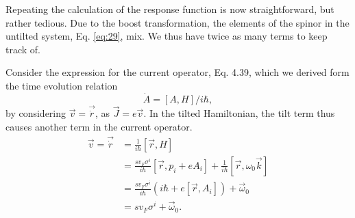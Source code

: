 Repeating the calculation of the response function is now straightforward, but rather tedious.
Due to the boost transformation, the elements of the spinor in the untilted system, Eq. \eqref{eq:29}, mix.
We thus have twice as many terms to keep track of.

Consider the expression for the current operator, Eq. 4.39, which we derived form the time evolution relation
\[
  \dot{A} = [A, H]/i\hbar,
\]
by considering \(\vec{v} = \vec\dot{r}\), as \(\vec{J} = e \vec{v}\).
In the tilted Hamiltonian, the tilt term thus causes another term in the current operator.
\begin{equation}
  \label{eq:36}
  \begin{split}
    \vec{v} = \vec\dot{r} &= \frac{1}{i \hbar } [\vec{r}, H] \\
    &= \frac{s v_{F} \sigma ^{ i}}{i \hbar } [\vec{r}, p_{i} + e A_{i}] + \frac{1}{i\hbar } [\vec{r}, \omega_{0} \vec{k}]\\
    &= \frac{s v_{F} \sigma ^{ i}}{i \hbar } (i\hbar + e[\vec{r}, A_{i}]) + \vec{\omega}_{0}\\
    &= s v_{F} \sigma ^{i} + \vec{\omega} _{0}.
  \end{split}
\end{equation}

